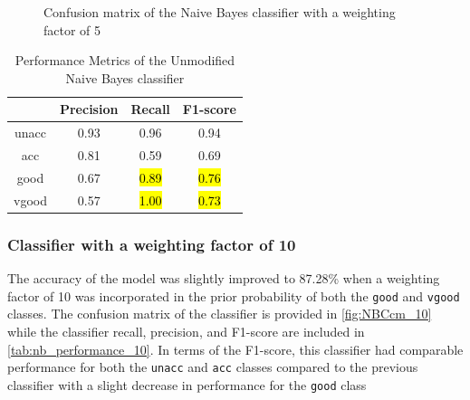 \documentclass[a4paper]{article}
\begin{document}
\begin{figure} [h!]
  \caption{Confusion matrix of the Naive Bayes classifier with a weighting factor of 5} 
  \label{fig:NBCcm_5}
\end{figure}

\begin{table}[h!]
  \centering
  \caption{Performance Metrics of the Unmodified Naive Bayes classifier}
  \label{tab:nb_performance_5}
  \begin{tabular}{||cccc||}
  \hline
  \textbf{ }    & \textbf{Precision}    & \textbf{Recall}   & \textbf{F1-score} \\
  \hline \hline
  unacc         & 0.93                  & 0.96              & 0.94\\ \hline
  acc           & 0.81                  & 0.59              & 0.69\\ \hline
  good          & 0.67                  & \hl{0.89}         & \hl{0.76}\\ \hline
  vgood         & 0.57                  & \hl{1.00}         & \hl{0.73}\\
  \hline
  \end{tabular}
\end{table}


\subsubsection{Classifier with a weighting factor of 10}
The accuracy of the model was slightly improved to 87.28\% when a weighting factor of 10 was incorporated in the prior probability of both the \lstinline{good} and \lstinline{vgood} classes. The confusion matrix of the classifier is provided in \autoref{fig:NBCcm_10} while the classifier recall, precision, and F1-score are included in \autoref{tab:nb_performance_10}. In terms of the F1-score, this classifier had comparable performance for both the \lstinline{unacc} and \lstinline{acc} classes compared to the previous classifier with a slight decrease in performance for the \lstinline{good} class
\end{document}
